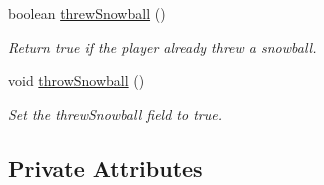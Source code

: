 \begin{DoxyCompactItemize}
boolean \hyperlink{classpkg__world_1_1Player_aec9bad13ead588d970cf28b6d2b5e4a2}{threw\-Snowball} ()
\begin{DoxyCompactList}\small\item\em Return true if the player already threw a snowball. \end{DoxyCompactList}\item 
void \hyperlink{classpkg__world_1_1Player_af27044cbbd51c6a1e7658e797563ca22}{throw\-Snowball} ()
\begin{DoxyCompactList}\small\item\em Set the threw\-Snowball field to true. \end{DoxyCompactList}\end{DoxyCompactItemize}
\subsection*{Private Attributes}
